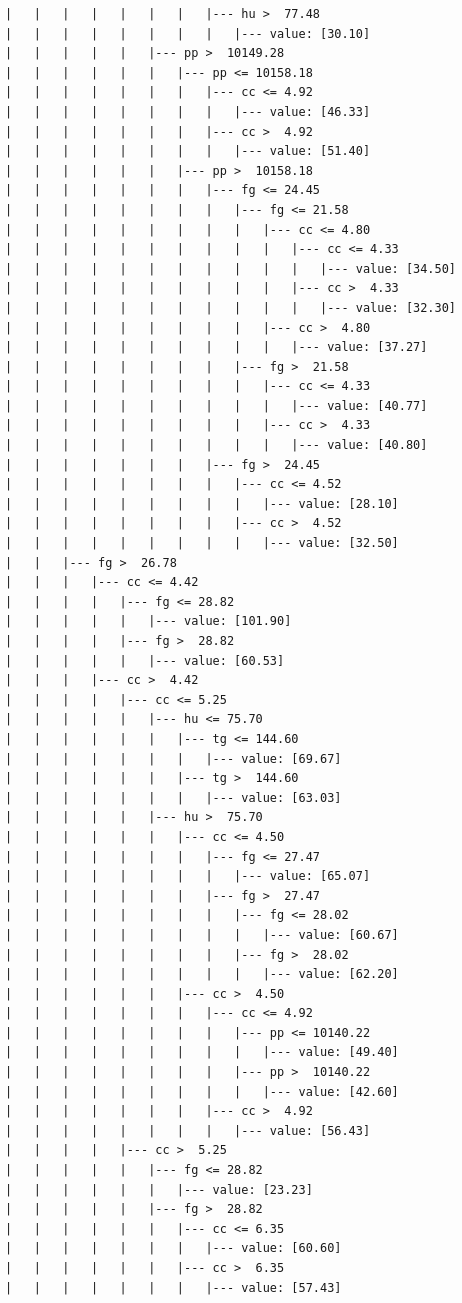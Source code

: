 \documentclass[UTF8, a4paper]{ctexart}
\begin{document}
\begin{lstlisting}
|   |   |   |   |   |   |   |--- hu >  77.48
|   |   |   |   |   |   |   |   |--- value: [30.10]
|   |   |   |   |   |--- pp >  10149.28
|   |   |   |   |   |   |--- pp <= 10158.18
|   |   |   |   |   |   |   |--- cc <= 4.92
|   |   |   |   |   |   |   |   |--- value: [46.33]
|   |   |   |   |   |   |   |--- cc >  4.92
|   |   |   |   |   |   |   |   |--- value: [51.40]
|   |   |   |   |   |   |--- pp >  10158.18
|   |   |   |   |   |   |   |--- fg <= 24.45
|   |   |   |   |   |   |   |   |--- fg <= 21.58
|   |   |   |   |   |   |   |   |   |--- cc <= 4.80
|   |   |   |   |   |   |   |   |   |   |--- cc <= 4.33
|   |   |   |   |   |   |   |   |   |   |   |--- value: [34.50]
|   |   |   |   |   |   |   |   |   |   |--- cc >  4.33
|   |   |   |   |   |   |   |   |   |   |   |--- value: [32.30]
|   |   |   |   |   |   |   |   |   |--- cc >  4.80
|   |   |   |   |   |   |   |   |   |   |--- value: [37.27]
|   |   |   |   |   |   |   |   |--- fg >  21.58
|   |   |   |   |   |   |   |   |   |--- cc <= 4.33
|   |   |   |   |   |   |   |   |   |   |--- value: [40.77]
|   |   |   |   |   |   |   |   |   |--- cc >  4.33
|   |   |   |   |   |   |   |   |   |   |--- value: [40.80]
|   |   |   |   |   |   |   |--- fg >  24.45
|   |   |   |   |   |   |   |   |--- cc <= 4.52
|   |   |   |   |   |   |   |   |   |--- value: [28.10]
|   |   |   |   |   |   |   |   |--- cc >  4.52
|   |   |   |   |   |   |   |   |   |--- value: [32.50]
|   |   |--- fg >  26.78
|   |   |   |--- cc <= 4.42
|   |   |   |   |--- fg <= 28.82
|   |   |   |   |   |--- value: [101.90]
|   |   |   |   |--- fg >  28.82
|   |   |   |   |   |--- value: [60.53]
|   |   |   |--- cc >  4.42
|   |   |   |   |--- cc <= 5.25
|   |   |   |   |   |--- hu <= 75.70
|   |   |   |   |   |   |--- tg <= 144.60
|   |   |   |   |   |   |   |--- value: [69.67]
|   |   |   |   |   |   |--- tg >  144.60
|   |   |   |   |   |   |   |--- value: [63.03]
|   |   |   |   |   |--- hu >  75.70
|   |   |   |   |   |   |--- cc <= 4.50
|   |   |   |   |   |   |   |--- fg <= 27.47
|   |   |   |   |   |   |   |   |--- value: [65.07]
|   |   |   |   |   |   |   |--- fg >  27.47
|   |   |   |   |   |   |   |   |--- fg <= 28.02
|   |   |   |   |   |   |   |   |   |--- value: [60.67]
|   |   |   |   |   |   |   |   |--- fg >  28.02
|   |   |   |   |   |   |   |   |   |--- value: [62.20]
|   |   |   |   |   |   |--- cc >  4.50
|   |   |   |   |   |   |   |--- cc <= 4.92
|   |   |   |   |   |   |   |   |--- pp <= 10140.22
|   |   |   |   |   |   |   |   |   |--- value: [49.40]
|   |   |   |   |   |   |   |   |--- pp >  10140.22
|   |   |   |   |   |   |   |   |   |--- value: [42.60]
|   |   |   |   |   |   |   |--- cc >  4.92
|   |   |   |   |   |   |   |   |--- value: [56.43]
|   |   |   |   |--- cc >  5.25
|   |   |   |   |   |--- fg <= 28.82
|   |   |   |   |   |   |--- value: [23.23]
|   |   |   |   |   |--- fg >  28.82
|   |   |   |   |   |   |--- cc <= 6.35
|   |   |   |   |   |   |   |--- value: [60.60]
|   |   |   |   |   |   |--- cc >  6.35
|   |   |   |   |   |   |   |--- value: [57.43]
\end{lstlisting}
\end{document}
